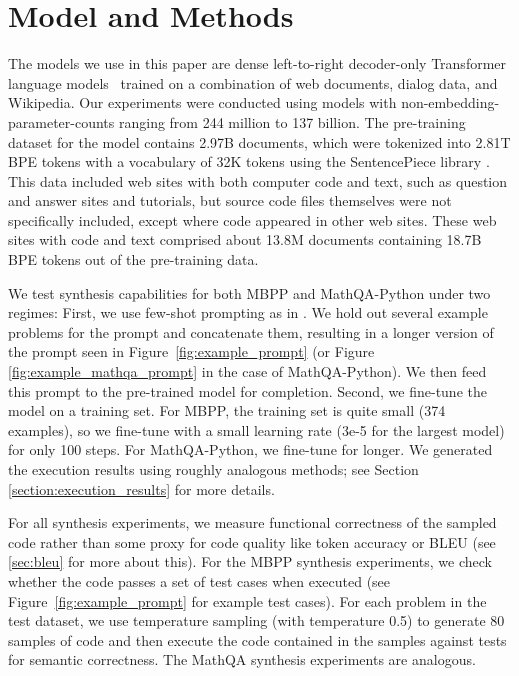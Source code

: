 \section{Model and Methods}
\label{sec:model}

The models we use in this paper are dense left-to-right decoder-only Transformer language models~\citep{Vaswani2017AttentionIA} trained on a combination of web documents, dialog data, and Wikipedia. Our experiments were conducted using models with non-embedding-parameter-counts ranging from 244 million to 137 billion. The pre-training dataset for the model contains 2.97B documents, which were tokenized into 2.81T BPE tokens with a vocabulary of 32K tokens using the SentencePiece library \citep{sentencepiece}. This data included web sites with both computer code and text, such as question and answer sites and tutorials, but source code files themselves were not specifically included, except where code appeared in other web sites. These web sites with code and text comprised about 13.8M documents containing 18.7B BPE tokens out of the pre-training data. 

We test synthesis capabilities for both MBPP and MathQA-Python under two regimes: First, we use few-shot prompting as in \cite{GPT3}. We hold out several example problems for the prompt and concatenate them, resulting in a longer version of the prompt seen in Figure~\ref{fig:example_prompt} (or Figure \ref{fig:example_mathqa_prompt} in the case of MathQA-Python). We then feed this prompt to the pre-trained model for completion. Second, we fine-tune the model on a training set. For MBPP, the training set is quite small (374 examples), so we fine-tune with a small learning rate (3e-5 for the largest model) for only 100 steps. For MathQA-Python, we fine-tune for longer. We generated the execution results using roughly analogous methods; see Section \ref{section:execution_results} for more details.

For all synthesis experiments, we measure functional correctness of the sampled code rather than some proxy for code quality like token accuracy or BLEU (see \autoref{sec:bleu} for more about this). For the MBPP synthesis experiments, we check whether the code passes a set of test cases when executed (see Figure~\ref{fig:example_prompt} for example test cases).  For each problem in the test dataset, we use temperature sampling (with temperature 0.5) to generate 80 samples of code and then execute the code contained in the samples against tests for semantic correctness. The MathQA synthesis experiments are analogous.

